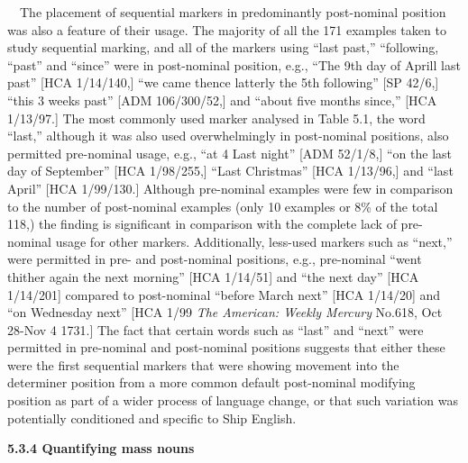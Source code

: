 \begin{styleStandard}
\ \ The placement of sequential markers in predominantly post-nominal position was also a feature of their usage. The majority of all the 171 examples taken to study sequential marking, and all of the markers using “last past,” “following, “past” and “since” were in post-nominal position, e.g., “The 9th day of Aprill last past” [HCA 1/14/140,] “we came thence latterly the 5th following” [SP 42/6,] “this 3 weeks past” [ADM 106/300/52,] and “about five months since,” [HCA 1/13/97.] The most commonly used marker analysed in Table 5.1, the word “last,” although it was also used overwhelmingly in post-nominal positions, also permitted pre-nominal usage, e.g., “at 4 Last night” [ADM 52/1/8,] “on the last day of September” [HCA 1/98/255,] “Last Christmas” [HCA 1/13/96,] and “last April” [HCA 1/99/130.] Although pre-nominal examples were few in comparison to the number of post-nominal examples (only 10 examples or 8\% of the total 118,) the finding is significant in comparison with the complete lack of pre-nominal usage for other markers. Additionally, less-used markers such as “next,” were permitted in pre- and post-nominal positions, e.g., pre-nominal “went thither again the next morning” [HCA 1/14/51] and “the next day” [HCA 1/14/201] compared to post-nominal “before March next” [HCA 1/14/20] and “on Wednesday next” [HCA 1/99 \textit{The American: Weekly Mercury} No.618, Oct 28-Nov 4 1731.] The fact that certain words such as “last” and “next” were permitted in pre-nominal and post-nominal positions suggests that either these were the first sequential markers that were showing movement into the determiner position from a more common default post-nominal modifying position as part of a wider process of language change, or that such variation was potentially conditioned and specific to Ship English. 
\end{styleStandard}

\begin{styleStandard}
\textbf{5.3.4 Quantifying mass nouns}
\end{styleStandard}

